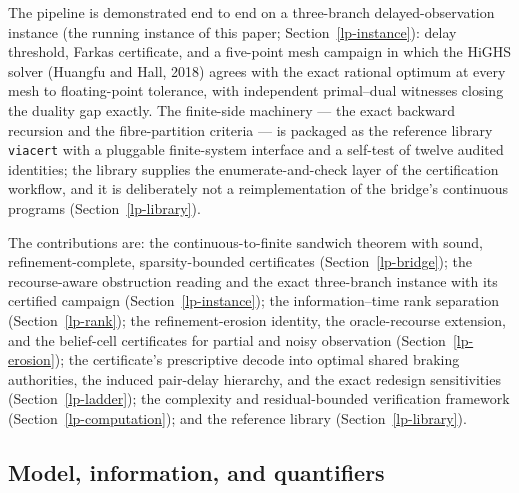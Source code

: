 \documentclass[10pt,twocolumn]{article}
\theoremstyle{plain}
\theoremstyle{definition}
\theoremstyle{remark}
\begin{document}
The pipeline is demonstrated end to end on a three-branch
delayed-observation instance (the running instance of this paper;
Section~\ref{lp-instance}): delay threshold, Farkas certificate, and a
five-point mesh campaign in which the HiGHS solver (Huangfu and Hall, 2018)
agrees with the exact rational optimum at every mesh to floating-point
tolerance, with independent
primal--dual witnesses closing the duality gap exactly. The finite-side
machinery --- the exact backward recursion and the fibre-partition criteria
--- is packaged as the reference library \texttt{viacert} with a pluggable
finite-system interface and a self-test of twelve audited identities; the
library supplies the enumerate-and-check layer of the certification
workflow, and it is deliberately not a reimplementation of the bridge's
continuous programs (Section~\ref{lp-library}).

The contributions are: the continuous-to-finite sandwich theorem with sound,
refinement-complete, sparsity-bounded certificates (Section~\ref{lp-bridge});
the recourse-aware obstruction reading and the exact three-branch instance
with its certified campaign (Section~\ref{lp-instance}); the
information--time rank separation (Section~\ref{lp-rank}); the refinement-erosion
identity, the oracle-recourse extension, and the belief-cell certificates
for partial and noisy observation (Section~\ref{lp-erosion}); the
certificate's prescriptive decode into optimal shared braking authorities,
the induced pair-delay hierarchy, and the exact redesign sensitivities
(Section~\ref{lp-ladder}); the
complexity and residual-bounded verification framework
(Section~\ref{lp-computation}); and the reference library
(Section~\ref{lp-library}).

\subsection{Model, information, and quantifiers}\label{lp-model}
\end{document}

